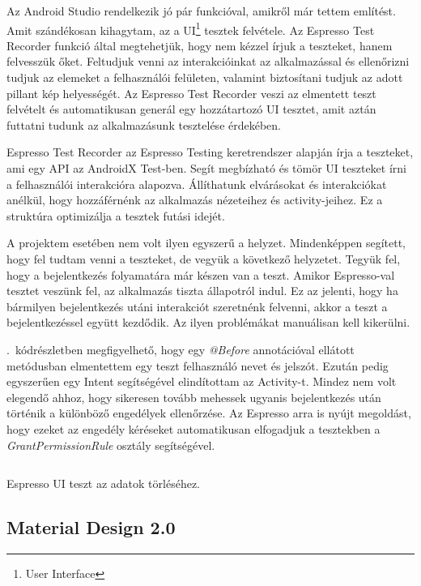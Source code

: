 \documentclass{thesis-ekf}
\theoremstyle{definition}
\theoremstyle{remark}
\begin{document}
Az Android Studio rendelkezik jó pár funkcióval, amikről már tettem említést.
Amit szándékosan kihagytam, az a UI\footnote{User Interface} tesztek felvétele.
Az Espresso Test Recorder funkció által megtehetjük, hogy nem kézzel írjuk a teszteket, hanem felvesszük őket.
Feltudjuk venni az interakcióinkat az alkalmazással és ellenőrizni tudjuk az elemeket a felhasználói felületen, valamint biztosítani tudjuk az adott pillant kép helyességét.
Az Espresso Test Recorder veszi az elmentett teszt felvételt és automatikusan generál egy hozzátartozó UI tesztet, amit aztán futtatni tudunk az alkalmazásunk tesztelése érdekében.

Espresso Test Recorder az Espresso Testing keretrendszer alapján írja a teszteket, ami egy API az AndroidX Test-ben.
Segít megbízható és tömör UI teszteket írni a felhasználói interakcióra alapozva.
Állíthatunk elvárásokat és interakciókat anélkül, hogy hozzáférnénk az alkalmazás nézeteihez és activity-jeihez.
Ez a struktúra optimizálja a tesztek futási idejét. \cite{espresso}

A projektem esetében nem volt ilyen egyszerű a helyzet.
Mindenképpen segített, hogy fel tudtam venni a teszteket, de vegyük a következő helyzetet.
Tegyük fel, hogy a bejelentkezés folyamatára már készen van a teszt.
Amikor Espresso-val tesztet veszünk fel, az alkalmazás tiszta állapotról indul.
Ez az jelenti, hogy ha bármilyen bejelentkezés utáni interakciót szeretnénk felvenni, akkor a teszt a bejelentkezéssel együtt kezdődik.
Az ilyen problémákat manuálisan kell kikerülni.

.~kódrészletben megfigyelhető, hogy egy \emph{@Before} annotációval ellátott metódusban elmentettem egy teszt felhasználó nevet és jelszót.
Ezután pedig egyszerűen egy Intent segítségével elindítottam az Activity-t.
Mindez nem volt elegendő ahhoz, hogy sikeresen tovább mehessek ugyanis bejelentkezés után történik a különböző engedélyek ellenőrzése.
Az Espresso arra is nyújt megoldást, hogy ezeket az engedély kéréseket automatikusan elfogadjuk a tesztekben a \emph{GrantPermissionRule} osztály segítségével.

\inputminted[linenos, breaklines]{java}{./codes/test.java}
\begin{listing}[H]
    \caption{Espresso UI teszt az adatok törléséhez.}
    \label{espressotest}
\end{listing}

\subsection{Material Design 2.0}
\end{document}
